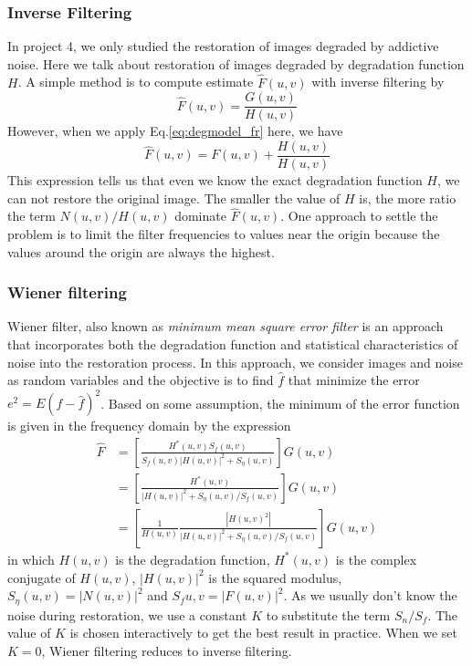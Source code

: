 \subsubsection{Inverse Filtering}
In project 4, we only studied the restoration of images degraded by addictive noise. Here we talk about restoration of images degraded by degradation function $H$. A simple method is to compute estimate $\hat{F}(u,v)$ with inverse filtering by \begin{equation} \hat{F}(u,v)=\frac{G(u,v)}{H(u,v)} \end{equation} However, when we apply Eq.\ref{eq:degmodel_fr} here, we have \begin{equation} \hat{F}(u,v)=F(u,v)+\frac{H(u,v)}{H(u,v)} \end{equation} This expression tells us that even we know the exact degradation function $H$, we can not restore the original image. The smaller the value of $H$ is, the more ratio the term $N(u,v)/H(u,v)$ dominate $\hat{F}(u,v)$. One approach to settle the problem is to limit the filter frequencies to values near the origin because the values around the origin are always the highest. 
\subsubsection{Wiener filtering}
Wiener filter, also known as \emph{minimum mean square error filter} is an approach that incorporates both the degradation function and statistical characteristics of noise into the restoration process. In this approach, we consider images and noise as random variables and the objective is to find $\hat{f}$ that minimize the error $e^2=E{(f-\hat{f})^2}$. Based on some assumption, the minimum of the error function is given in the frequency domain by the expression \begin{equation}\begin{aligned} \hat{F}&=\left[ \frac{H^*(u,v)S_f(u,v)}{S_f(u,v)|H(u,v)|^2+S_{\eta}(u,v)} \right]G(u,v) \\ &=\left[\frac{H^*(u,v)}{|H(u,v)|^2+S_{\eta}(u,v)/S_f(u,v)}\right]G(u,v) \\ &=\left[ \frac{1}{H(u,v)}\frac{|H(u,v)^2|}{|H(u,v)|^2+S_{\eta}(u,v)/S_f(u,v)} \right]G(u,v) \end{aligned}\end{equation} in which $H(u,v)$ is the degradation function, $H^*(u,v)$ is the complex conjugate of $H(u,v)$, $|H(u,v)|^2$ is the squared modulus, $S_{\eta}(u,v)=|N(u,v)|^2$ and $S_f{u,v}=|F(u,v)|^2$. As we usually don't know the noise during restoration, we use a constant $K$ to substitute the term $S_n/S_f$. The value of $K$ is chosen interactively to get the best result in practice. When we set $K=0$, Wiener filtering reduces to inverse filtering.

